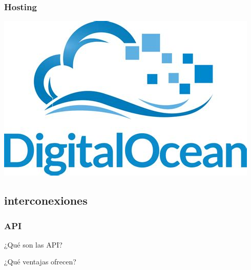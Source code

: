 \documentclass{beamer}
\begin{document}
\begin{frame}
\begin{table}
    \end{table}
\end{frame}

\begin{frame}
    \frametitle{Hosting}
    \begin{table}
        \includegraphics[width=0.8\linewidth]{../images/diapositivas/digitalOcean.jpeg}
    \end{table}
\end{frame}

\subsection{interconexiones}

\begin{frame}
    \frametitle{API}
    ¿Qué son las API? \break \vfill
    \pause

    ¿Qué ventajas ofrecen?
\end{frame}
\end{document}
